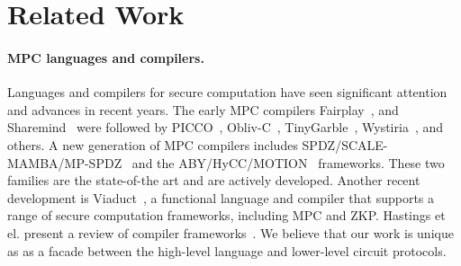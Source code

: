 \section{Related Work}
\label{sec:related}

\paragraph{MPC languages and compilers.}
Languages and compilers for secure computation have seen significant attention and advances in recent years. The early MPC compilers Fairplay~\cite{CCS:BenNisPin08},
and Sharemind~\cite{ESORICS:BogLauWil08} were followed by PICCO~\cite{CCS:ZhaSteBla13}, Obliv-C~\cite{Zahur:2015}, TinyGarble~\cite{SP:SHSSK15},
Wystiria~\cite{SP:RasHamHic14}, and others. A new generation of MPC compilers
includes SPDZ/SCALE-MAMBA/MP-SPDZ~\cite{Keller:2020} and the ABY/HyCC/MOTION~\cite{NDSS:DemSchZoh15,CCS:BDKKS18,Braun:2022} frameworks.
These two families are the state-of-the art and
are actively developed. Another recent development is Viaduct~\cite{Acay:2021}, a functional language and compiler that supports a range of secure computation
frameworks, including MPC and ZKP. Hastings et el. present a review of compiler frameworks~\cite{Hastings:2019}. We believe that our work is unique as 
as a facade between the high-level language and lower-level circuit protocols.

